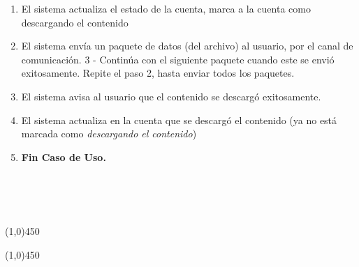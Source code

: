 \documentclass[11pt, a4paper, spanish]{article}
\begin{document}
\begin{enumerate}
	\item El sistema actualiza el estado de la cuenta, marca a la cuenta como descargando el contenido
\item El sistema env\'ia un paquete de datos (del archivo) al usuario, por el canal de comunicaci\'on. 3 - Contin\'ua con el siguiente paquete cuando este se envi\'o exitosamente. Repite el paso 2, hasta enviar todos los paquetes.
	\item El sistema avisa al usuario que el contenido se descarg\'o exitosamente.
	\item El sistema actualiza en la cuenta que se descarg\'o el contenido (ya no est\'a marcada como \emph{descargando el contenido})
	\item \textbf{Fin Caso de Uso.}

\end{enumerate}

 \\

\\

\\
\begin{center} \line(1,0){450} \end{center}

\newpage

\begin{center} \line(1,0){450} \end{center}
\end{document}

